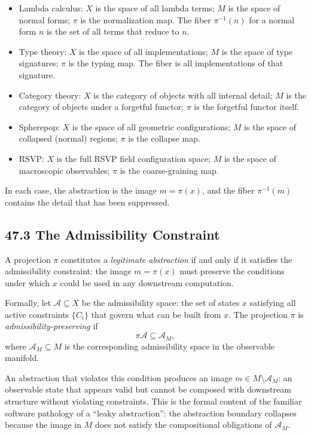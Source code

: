 \documentclass[12pt,letterpaper]{article}
\theoremstyle{remark}
\begin{document}
\begin{itemize}
\item Lambda calculus: $X$ is the space of all lambda terms; $M$
  is the space of normal forms; $\pi$ is the normalization map.
  The fiber $\pi^{-1}(n)$ for a normal form $n$ is the set of all
  terms that reduce to $n$.

\item Type theory: $X$ is the space of all implementations; $M$
  is the space of type signatures; $\pi$ is the typing map. The
  fiber is all implementations of that signature.

\item Category theory: $X$ is the category of objects with all
  internal detail; $M$ is the category of objects under a forgetful
  functor; $\pi$ is the forgetful functor itself.

\item Spherepop: $X$ is the space of all geometric configurations;
  $M$ is the space of collapsed (normal) regions; $\pi$ is the
  collapse map.

\item RSVP: $X$ is the full RSVP field configuration space;
  $M$ is the space of macroscopic observables; $\pi$ is the
  coarse-graining map.
\end{itemize}

In each case, the abstraction is the image $m = \pi(x)$, and the
fiber $\pi^{-1}(m)$ contains the detail that has been suppressed.

\subsection{47.3 The Admissibility Constraint}

A projection $\pi$ constitutes a \emph{legitimate abstraction} if
and only if it satisfies the admissibility constraint: the image
$m = \pi(x)$ must preserve the conditions under which $x$ could
be used in any downstream computation.

Formally, let $\mathcal{A} \subseteq X$ be the admissibility space:
the set of states $x$ satisfying all active constraints $\{C_i\}$
that govern what can be built from $x$. The projection $\pi$ is
\emph{admissibility-preserving} if
\[
\pi\mathcal{A} \subseteq \mathcal{A}_M,
\]
where $\mathcal{A}_M \subseteq M$ is the corresponding admissibility
space in the observable manifold.

An abstraction that violates this condition produces an image $m
\in M \setminus \mathcal{A}_M$: an observable state that appears
valid but cannot be composed with downstream structure without
violating constraints. This is the formal content of the familiar
software pathology of a ``leaky abstraction'': the abstraction
boundary collapses because the image in $M$ does not satisfy the
compositional obligations of $\mathcal{A}_M$.
\end{document}
